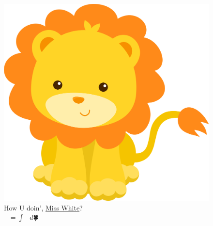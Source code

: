 \documentclass[a4paper,english]{article}
\begin{document}
	\thispagestyle{empty}
	\begin{figure}
		\centering
		\includegraphics[width=1.0\linewidth]{img/lion.png}
		\caption*{How U doin', \href{http://how-u-doing.github.io/}{Miss 
		White}?
			\\ $🐊^{🐊^{🐊}} = ∫_{🎃}^{🎅} 🙊 \ d🍀$ }
		\label{cover:lion}
	\end{figure}
	\pagecolor{pink}
	\afterpage{\nopagecolor}
	\clearpage
	\newpage
	
\end{document}
